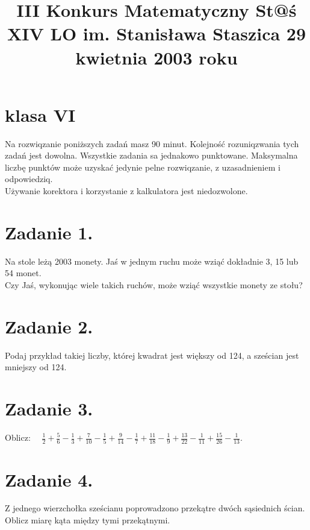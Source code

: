 \documentclass[10pt]{article}
\title{III Konkurs Matematyczny St@ś XIV LO im. Stanisława Staszica 29 kwietnia 2003 roku }
\author{}
\date{}
\begin{document}
\maketitle
\section*{klasa VI}
Na rozwiqzanie poniższych zadań masz 90 minut. Kolejność rozuniqzwania tych zadań jest dowolna. Wszystkie zadania sa jednakowo punktowane. Maksymalna liczbę punktów może uzyskać jedynie pelne rozwiqzanie, z uzasadnieniem i odpowiedziq.\\
Używanie korektora i korzystanie z kalkulatora jest niedozwolone.

\section*{Zadanie 1.}
Na stole leżą 2003 monety. Jaś w jednym ruchu może wziąć dokładnie 3, 15 lub 54 monet.\\
Czy Jaś, wykonując wiele takich ruchów, może wziąć wszystkie monety ze stołu?

\section*{Zadanie 2.}
Podaj przykład takiej liczby, której kwadrat jest większy od 124, a sześcian jest mniejszy od 124.

\section*{Zadanie 3.}
Oblicz: \(\quad \frac{1}{2}+\frac{5}{6}-\frac{1}{3}+\frac{7}{10}-\frac{1}{5}+\frac{9}{14}-\frac{1}{7}+\frac{11}{18}-\frac{1}{9}+\frac{13}{22}-\frac{1}{11}+\frac{15}{26}-\frac{1}{13}\).

\section*{Zadanie 4.}
Z jednego wierzchołka sześcianu poprowadzono przekątre dwóch sąsiednich ścian.\\
Oblicz miarę kąta między tymi przekątnymi.
\end{document}
